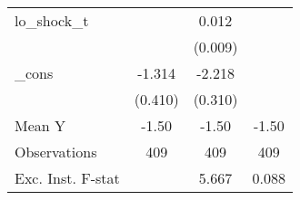 {\begin{tabular}{l*{3}{c}}
\addlinespace
lo\_shock\_t  &                     &       0.012         &                     \\
            &                     &     (0.009)         &                     \\
\addlinespace
\_cons      &      -1.314\sym{***}&      -2.218\sym{***}&                     \\
            &     (0.410)         &     (0.310)         &                     \\
\midrule
Mean Y      &       -1.50         &       -1.50         &       -1.50         \\
Observations&         409         &         409         &         409         \\
Exc. Inst. F-stat&                     &       5.667         &       0.088         \\
\bottomrule
\end{tabular}
}
